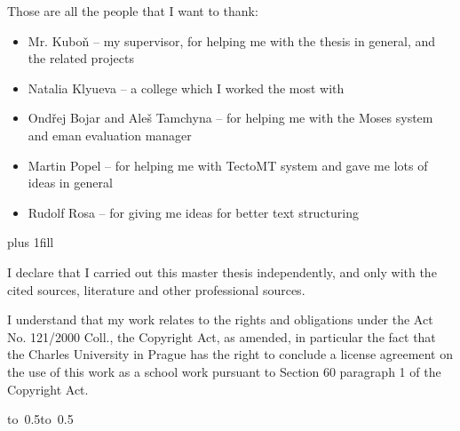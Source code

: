 \newpage



\openright

\noindent

Those are all the people that I want to thank:

\begin{itemize}
\item Mr. Kuboň -- my supervisor, for helping me with the thesis in general, and the related projects
\item Natalia Klyueva -- a college which I worked the most with
\item Ondřej Bojar and Aleš Tamchyna -- for helping me with the Moses system and eman evaluation manager
\item Martin Popel -- for helping me with TectoMT system and gave me lots of ideas in general
\item Rudolf Rosa -- for giving me ideas for better text structuring
\end{itemize}

\newpage


\vglue 0pt plus 1fill

\noindent
I declare that I carried out this master thesis independently, and only with the cited
sources, literature and other professional sources.

\medskip\noindent
I understand that my work relates to the rights and obligations under the Act No.
121/2000 Coll., the Copyright Act, as amended, in particular the fact that the Charles
University in Prague has the right to conclude a license agreement on the use of this
work as a school work pursuant to Section 60 paragraph 1 of the Copyright Act.

\vspace{10mm}

\hbox{\hbox to 0.5\hbox to 0.5}

\vspace{20mm}
\newpage


